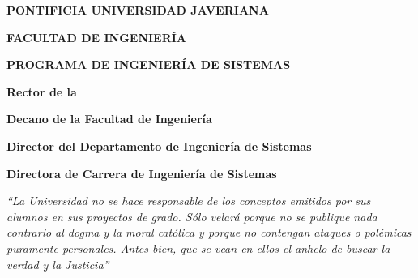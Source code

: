 \documentclass[12pt,letterpaper,oneside]{article}
\DeclareRobustCommand{\_}{\textunderscore\allowbreak}
\newcommand{\universidad}{PONTIFICIA UNIVERSIDAD JAVERIANA}
\newcommand{\facultad}{FACULTAD DE INGENIERÍA}
\newcommand{\programa}{PROGRAMA DE INGENIERÍA DE SISTEMAS}
\begin{document}
\begin{center}
  {\bfseries \universidad}\par
  {\bfseries \facultad}\par
  {\bfseries \programa}\par
  \vspace{6cm}

  {\bfseries Rector de la \universidadNombre}\par
  \vspace{0.4cm}
  \rector\par
  \vspace{0.9cm}

  {\bfseries Decano de la Facultad de Ingeniería}\par
  \vspace{0.4cm}
  \decano\par
  \vspace{0.9cm}

  {\bfseries Director del Departamento de Ingeniería de Sistemas}\par
  \vspace{0.4cm}
  \directorDepto\par
  \vspace{0.9cm}

  {\bfseries Directora de Carrera de Ingeniería de Sistemas}\par
  \vspace{0.4cm}
  \directorCarrera\par
\end{center}
\clearpage

\vspace{1cm}

{\itshape\noindent
``La Universidad no se hace responsable de los conceptos emitidos por sus alumnos en sus
proyectos de grado. Sólo velará porque no se publique nada contrario al dogma y la moral
católica y porque no contengan ataques o polémicas puramente personales. Antes bien, que se
vean en ellos el anhelo de buscar la verdad y la Justicia''\par}
\clearpage
\endgroup


\tableofcontents
\clearpage
\listoffigures
\clearpage
\listoftables
\end{document}

